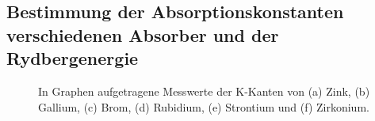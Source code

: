 \documentclass[titlepage = firstcover]{scrartcl}
\begin{document}
      \subsection{Bestimmung der Absorptionskonstanten verschiedenen Absorber und der Rydbergenergie}
        \begin{figure}[ht]
          \centering
          \quad
          \quad
          \quad
          \quad
          \quad
          \caption{In Graphen aufgetragene Messwerte der K-Kanten von (a) Zink, (b) Gallium, (c) Brom, (d) Rubidium, (e) Strontium und (f) Zirkonium.}
        \end{figure}
        \FloatBarrier
\end{document}

